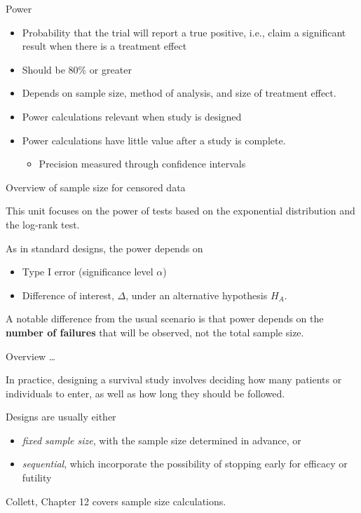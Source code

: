 \documentclass[ignorenonframetext,]{beamer}
\providecommand{\tightlist}{%
  \setlength{\itemsep}{0pt}\setlength{\parskip}{0pt}}
\begin{document}
\begin{frame}{%
\protect\hypertarget{power}{%
Power}}

\begin{itemize}
\item
  Probability that the trial will report a true positive, i.e., claim a
  significant result when there is a treatment effect
\item
  Should be 80\% or greater
\item
  Depends on sample size, method of analysis, and size of treatment
  effect.
\item
  Power calculations relevant when study is designed
\item
  Power calculations have little value after a study is complete.

  \begin{itemize}
  \tightlist
  \item
    Precision measured through confidence intervals
  \end{itemize}
\end{itemize}

\end{frame}

\begin{frame}{%
\protect\hypertarget{overview-of-sample-size-for-censored-data}{%
Overview of sample size for censored data}}

This unit focuses on the power of tests based on the exponential
distribution and the log-rank test.

As in standard designs, the power depends on

\begin{itemize}
\item
  Type I error (significance level \(\alpha\))
\item
  Difference of interest, \(\Delta\), under an alternative hypothesis
  \(H_A\).
\end{itemize}

A notable difference from the usual scenario is that power depends on
the \textbf{number of failures} that will be observed, not the total
sample size.

\end{frame}

\begin{frame}{%
\protect\hypertarget{overview}{%
Overview \ldots}}

In practice, designing a survival study involves deciding how many
patients or individuals to enter, as well as how long they should be
followed.

Designs are usually either

\begin{itemize}
\item
  \emph{fixed sample size}, with the sample size determined in advance,
  or
\item
  \emph{sequential}, which incorporate the possibility of stopping early
  for efficacy or futility
\end{itemize}

Collett, Chapter 12 covers sample size calculations.

\end{frame}
\end{document}

